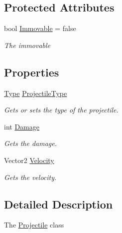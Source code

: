 \subsection*{Protected Attributes}
\begin{DoxyCompactItemize}
\item 
bool \hyperlink{classXaria_1_1Projectile_adb312ec0bbc57be2a7099a4ecd556bb8}{Immovable} = false
\begin{DoxyCompactList}\small\item\em The immovable \end{DoxyCompactList}\end{DoxyCompactItemize}
\subsection*{Properties}
\begin{DoxyCompactItemize}
\item 
\hyperlink{classXaria_1_1Projectile_a2f223d18f3b68ae549d974125826b78d}{Type} \hyperlink{classXaria_1_1Projectile_af608c1c14ba53f0b8ae20d52e951db17}{Projectile\+Type}
\begin{DoxyCompactList}\small\item\em Gets or sets the type of the projectile. \end{DoxyCompactList}\item 
int \hyperlink{classXaria_1_1Projectile_a5d5fcce1800aa018bc32689837d2020d}{Damage}
\begin{DoxyCompactList}\small\item\em Gets the damage. \end{DoxyCompactList}\item 
Vector2 \hyperlink{classXaria_1_1Projectile_a5783afe0045a081c6d285cf6801eb983}{Velocity}
\begin{DoxyCompactList}\small\item\em Gets the velocity. \end{DoxyCompactList}\end{DoxyCompactItemize}


\subsection{Detailed Description}
The \hyperlink{classXaria_1_1Projectile}{Projectile} class 

